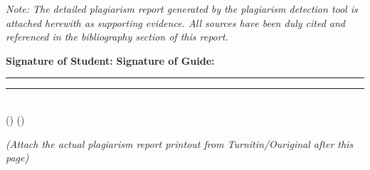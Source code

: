 \vspace{0.5cm}

\noindent\textit{Note: The detailed plagiarism report generated by the plagiarism detection tool is attached herewith as supporting evidence. All sources have been duly cited and referenced in the bibliography section of this report.}\\

\vspace{1cm}

\noindent\textbf{Signature of Student:} \hspace{4cm} \textbf{Signature of Guide:} \\

\vspace{1.5cm}

\noindent\rule{5cm}{0.4pt} \hfill \rule{5cm}{0.4pt} \\
\noindent (\StudentName) \hfill (\SupervisorName) \\

\vspace{1cm}

\noindent\textit{(Attach the actual plagiarism report printout from Turnitin/Ouriginal after this page)}
